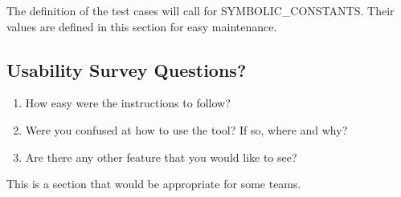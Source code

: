 \documentclass[12pt, titlepage]{article}
\begin{document}
The definition of the test cases will call for SYMBOLIC\_CONSTANTS.
Their values are defined in this section for easy maintenance.

\subsection{Usability Survey Questions?}
\begin{enumerate}
\item How easy were the instructions to follow?

\item Were you confused at how to use the tool? If so, where and why?

\item Are there any other feature that you would like to see?

\end{enumerate}
This is a section that would be appropriate for some teams.
\end{document}
